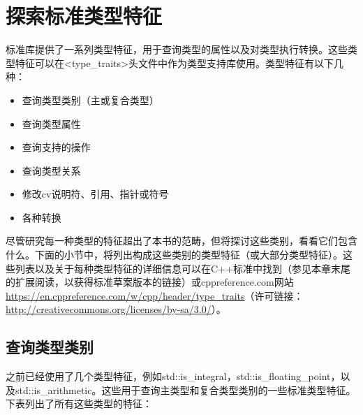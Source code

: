 \section{探索标准类型特征}

标准库提供了一系列类型特征，用于查询类型的属性以及对类型执行转换。这些类型特征可以在<type\_traits>头文件中作为类型支持库使用。类型特征有以下几种：

\begin{itemize}
  \item
        查询类型类别（主或复合类型）

  \item
        查询类型属性

  \item
        查询支持的操作

  \item
        查询类型关系

  \item
        修改cv说明符、引用、指针或符号

  \item
        各种转换
\end{itemize}

尽管研究每一种类型的特征超出了本书的范畴，但将探讨这些类别，看看它们包含什么。下面的小节中，将列出构成这些类别的类型特征（或大部分类型特征）。这些列表以及关于每种类型特征的详细信息可以在C++标准中找到（参见本章末尾的扩展阅读，以获得标准草案版本的链接）或cppreference.com网站\url{https://en.cppreference.com/w/cpp/header/type_traits}（许可链接：\url{http://creativecommons.org/licenses/by-sa/3.0/}）。

\subsection{查询类型类别}

之前已经使用了几个类型特征，例如std::is\_integral，std::is\_floating\_point，以及std::is\_arithmetic。这些用于查询主类型和复合类型类别的一些标准类型特征。下表列出了所有这些类型的特征：

